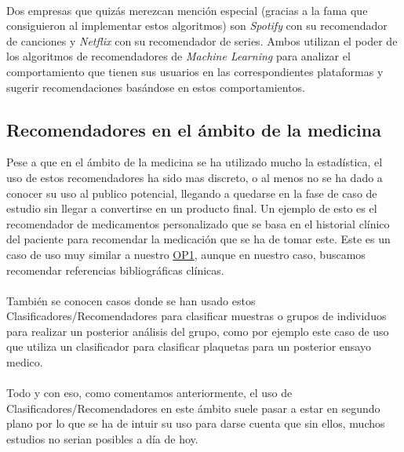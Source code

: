 \paragraph{}
Dos empresas que quizás merezcan mención especial (gracias a la fama que consiguieron al implementar estos algoritmos) son \textit{Spotify}\cite{ref:music_recommender} con su recomendador de canciones y \textit{Netflix}\cite{ref:netflix} con su recomendador de series. Ambos utilizan el poder de los algoritmos de recomendadores de \textit{Machine Learning} para analizar el comportamiento que tienen sus usuarios en las correspondientes plataformas y sugerir recomendaciones basándose en estos comportamientos.


\subsection{Recomendadores en el ámbito de la medicina}
Pese a que en el ámbito de la medicina se ha utilizado mucho la estadística, el uso de estos recomendadores ha sido mas discreto, o al menos no se ha dado a conocer su uso al publico potencial, llegando a quedarse en la fase de caso de estudio sin llegar a convertirse en un producto final. Un ejemplo de esto es el recomendador de medicamentos personalizado\cite{ref:refer_medical_prescriptions} que se basa en el historial clínico del paciente para recomendar la medicación que se ha de tomar este. Este es un caso de uso muy similar a nuestro \hyperref[op:OP1]{OP1}, aunque en nuestro caso, buscamos recomendar referencias bibliográficas clínicas.

\paragraph{}
También se conocen casos donde se han usado estos Clasificadores/Recomendadores para clasificar muestras o grupos de individuos para realizar un posterior análisis del grupo, como por ejemplo este caso de uso\cite{ref:refer_classify_plaquetas} que utiliza un clasificador para clasificar plaquetas para un posterior ensayo medico.

\paragraph{}
Todo y con eso, como comentamos anteriormente, el uso de Clasificadores/Recomendadores en este ámbito suele pasar a estar en segundo plano por lo que se ha de intuir su uso para darse cuenta que sin ellos, muchos estudios no serian posibles a día de hoy.


